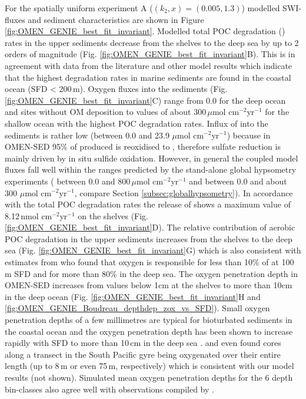 \documentclass[gmd, manuscript]{copernicus}
\begin{document}
For the spatially uniform experiment A ($(k_2, x) = (0.005, 1.3)$) modelled SWI-fluxes and sediment characteristics are shown in Figure \ref{fig:OMEN_GENIE_best_fit_invariant}.
Modelled total POC degradation () rates in the upper sediments decrease from the shelves to the deep sea by up to 2 orders of magnitude (Fig. \ref{fig:OMEN_GENIE_best_fit_invariant}B). 
This is in agreement with data from the literature \citep[e.g.][]{middelburg_organic_1993, middelburg_empirical_1997, burdige_preservation_2007} 
and other model results \citep[e.g.][]{thullner_global_scale_2009} which indicate that the highest degradation rates in marine sediments are found in the coastal ocean (SFD < 200\,m). 
Oxygen fluxes into the sediments (Fig. \ref{fig:OMEN_GENIE_best_fit_invariant}C) range from 0.0 for the deep ocean and sites without OM deposition to values of about 300\,$\mu$mol cm$^{-2}$yr$^{-1}$ for the shallow ocean with the highest POC degradation rates. 
Influx of   into the sediments is rather low (between 0.0 and 23.9 $\mu$mol cm$^{-2}$yr$^{-1}$) because in OMEN-SED 95\% of produced  is reoxidised to , therefore sulfate reduction is mainly driven by in situ sulfide oxidation. 
However, in general the coupled model fluxes fall well within the ranges predicted by the stand-alone global hypsometry experiments ( between 0.0 and 800\,$\mu$mol cm$^{-2}$yr$^{-1}$ and  between 0.0 and about 300 $\mu$mol cm$^{-2}$yr$^{-1}$, 
compare Section \ref{subsec:globalhypsometry}). 
In accordance with the total POC degradation rates the release of  shows a maximum value of 8.12\,nmol cm$^{-2}$yr$^{-1}$ on the shelves (Fig. \ref{fig:OMEN_GENIE_best_fit_invariant}D). 
The relative contribution of aerobic POC degradation in the upper sediments increases from the shelves to the deep sea (Fig. \ref{fig:OMEN_GENIE_best_fit_invariant}G) 
which is also consistent with estimates from %
\citet{thullner_global_scale_2009} who found that oxygen is responsible for less than 10\% of  at 100\,m SFD and for more 
than 80\% in the deep sea. 
The oxygen penetration depth in OMEN-SED increases from values below 1cm at the shelves to more than 10cm in the deep ocean (Fig. \ref{fig:OMEN_GENIE_best_fit_invariant}H 
and \ref{fig:OMEN_GENIE_Boudreau_depthdep_zox_vs_SFD}).
Small oxygen penetration depths of a few millimetres are typical for bioturbated sediments in the coastal ocean \citep[e.g.][]{wenzhofer_benthic_2002} and 
the oxygen penetration depth has been shown to increase rapidly with SFD to more than 10\,cm in the deep sea \citep{meile_global_2003, glud_oxygen_2008}. 
\citet{fischer_oxygen_2009} and \citet{dhondt_presence_2015} even found cores along a transect in the South Pacific gyre being oxygenated over their entire length (up to 8\,m or even 75\,m, respectively) which is consistent 
with our model results (not shown). Simulated mean oxygen penetration depths for the 6 depth bin-classes also agree well with observations compiled by 
\citet[][Fig. \ref{fig:OMEN_GENIE_Boudreau_depthdep_zox_vs_SFD}]{meile_global_2003}.
\end{document}
